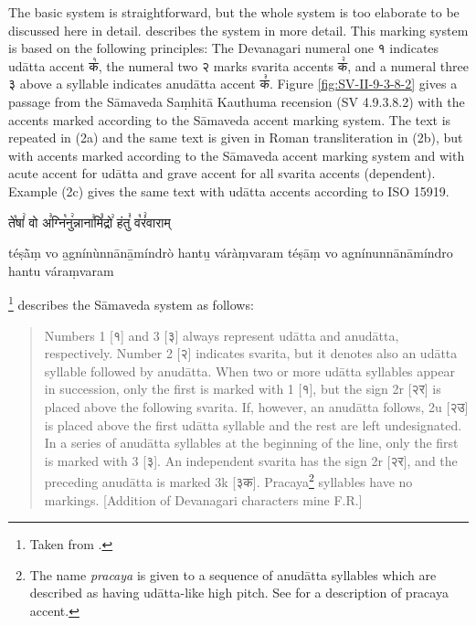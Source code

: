 The basic system is straightforward, but the whole system is too elaborate to be discussed here in detail. \citet[p.~19]{Scharf2007} describes the system in more detail. This marking system is based on the following principles: The Devanagari numeral one {\devfont १} indicates udātta accent {\devfont क꣡}, the numeral two {\devfont २} marks svarita accents {\devfont क꣢}, and a numeral three {\devfont ३} above a syllable indicates anudātta accent {\devfont क꣣}. Figure \ref{fig:SV-II-9-3-8-2} gives a passage from the Sāmaveda Saṃhitā Kauthuma recension (SV 4.9.3.8.2) with the accents marked according to the Sāmaveda accent marking system. The text is repeated in (2a) and the same text is given in Roman transliteration in (2b), but with accents marked according to the Sāmaveda accent marking system and with acute accent for udātta and grave accent for all svarita accents (dependent). Example (2c) gives the same text with udātta accents according to ISO 15919.

\begin{exe}
\ex
\begin{xlist}
\ex \begin{devfont}ते꣡षां꣢ वो अ꣣ग्नि꣡नु꣢न्नाना꣣मिं꣡द्रो꣢ हंतु꣣ व꣡रं꣢वाराम्\end{devfont}
\ex téṣā̀ṃ vo a̲gnínùnnānā̲míndrò hantu̲ váràṃvaram
\ex téṣāṃ vo agnínunnānāmíndro hantu váraṃvaram
\end{xlist}
\end{exe}


\citet[p.~228-229]{Howard1986}\footnote{Taken from \citet[p.~3]{EversonScharf2007}.} describes the Sāmaveda system as follows:

\begin{quote}Numbers 1 [{\devfont १}] and 3 [{\devfont ३}] always represent udātta and anudātta, respectively. Number 2 [{\devfont २}] indicates svarita, but it denotes also an udātta syllable followed by anudātta. When two or more udātta syllables appear in succession, only the first is marked with 1 [{\devfont १}], but the sign 2r [{\devfont २र}] is placed above the following svarita. If, however, an anudātta follows, 2u [{\devfont २उ}] is placed above the first udātta syllable and the rest are left undesignated. In a series of anudātta syllables at the beginning of the line, only the first is marked with 3 [{\devfont ३}]. An independent svarita has the sign 2r [{\devfont २र}], and the preceding anudātta is marked 3k [{\devfont ३क}]. Pracaya\footnote{The name \emph{pracaya} is given to a sequence of anudātta syllables which are described as having udātta-like high pitch. See \citet{Whitney1869} for a description of pracaya accent.} syllables have no markings. [Addition of Devanagari characters mine F.R.]\end{quote}

